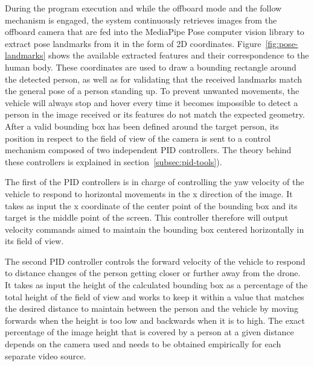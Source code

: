 During the program execution and while the offboard mode and the follow mechanism is engaged, the system continuously retrieves images from the offboard camera that are fed into the MediaPipe Pose \cite{mp-pose-paper} computer vision library to extract pose landmarks from it in the form of 2D coordinates.
Figure~\ref{fig:pose-landmarks} shows the available extracted features and their correspondence to the human body.
These coordinates are used to draw a bounding rectangle around the detected person, as well as for validating that the received landmarks match the general pose of a person standing up.
To prevent unwanted movements, the vehicle will always stop and hover every time it becomes impossible to detect a person in the image received or its features do not match the expected geometry.
After a valid bounding box has been defined around the target person, its position in respect to the field of view of the camera is sent to a control mechanism composed of two independent PID controllers. The theory behind these controllers is explained in section~\ref{subsec:pid-tools}).

The first of the PID controllers is in charge of controlling the yaw velocity of the vehicle to respond to horizontal movements in the x direction of the image. 
It takes as input the x coordinate of the center point of the bounding box and its target is the middle point of the screen.
This controller therefore will output velocity commands aimed to maintain the bounding box centered horizontally in its field of view.

The second PID controller controls the forward velocity of the vehicle to respond to distance changes of the person getting closer or further away from the drone.
It takes as input the height of the calculated bounding box as a percentage of the total height of the field of view and works to keep it within a value that matches the desired distance to maintain between the person and the vehicle by moving forwards when the height is too low and backwards when it is to high.
The exact percentage of the image height that is covered by a person at a given distance depends on the camera used and needs to be obtained empirically for each separate video source.




